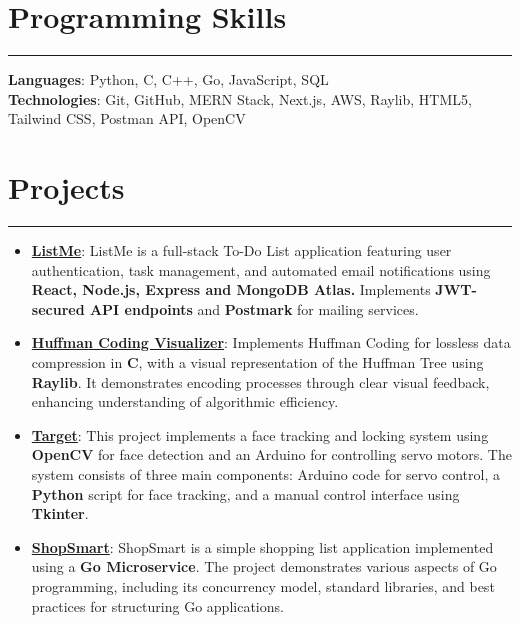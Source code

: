 \documentclass[a4paper,10pt]{article}
\begin{document}
\section*{Programming Skills}
\vspace{-.2em}
\hrule
\vspace{0.5em}

\textbf{Languages}: Python, C, C++, Go, JavaScript, SQL \vspace{0.5em} \\
\textbf{Technologies}: Git, GitHub, MERN Stack, Next.js, AWS, Raylib, HTML5, Tailwind CSS, Postman API, OpenCV

\section*{Projects}
\vspace{-.2em}
\hrule
\vspace{0.5em}

\begin{itemize}
    \item \textbf{\href{https://github.com/thearfa99/mern}{ListMe}}: ListMe is a full-stack To-Do List application featuring user authentication, task management, and automated email notifications using \textbf{React, Node.js, Express and MongoDB Atlas.} Implements \textbf{JWT-secured API endpoints} and \textbf{Postmark} for mailing services.
    \item \textbf{\href{https://github.com/thearfa99/huft}{Huffman Coding Visualizer}}: Implements Huffman Coding for lossless data compression in \textbf{C}, with a visual representation of the Huffman Tree using \textbf{Raylib}. It demonstrates encoding processes through clear visual feedback, enhancing understanding of algorithmic efficiency.
    \item \textbf{\href{https://github.com/thearfa99/tureet}{Target}}: This project implements a face tracking and locking system using \textbf{OpenCV} for face detection and an Arduino for controlling servo motors. The system consists of three main components: Arduino code for servo control, a \textbf{Python} script for face tracking, and a manual control interface using \textbf{Tkinter}.
    \item \textbf{\href{https://github.com/thearfa99/ShopSmart}{ShopSmart}}: ShopSmart is a simple shopping list application implemented using a \textbf{Go Microservice}. The project demonstrates various aspects of Go programming, including its concurrency model, standard libraries, and best practices for structuring Go applications.
\end{itemize}
\end{document}

